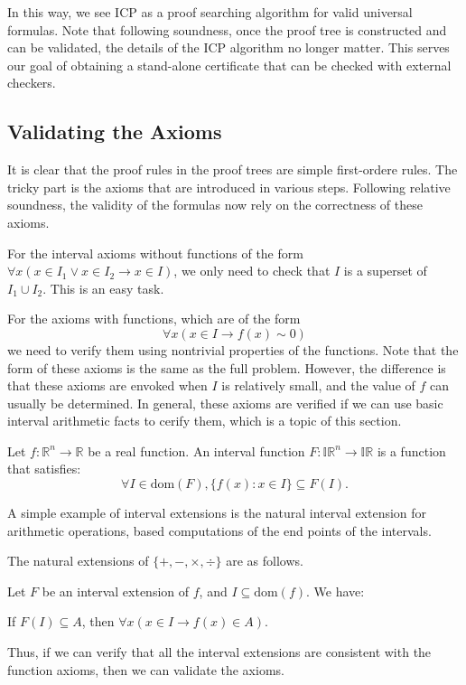\documentclass[envcountsect]{llncs}
\newcommand{\dom}{\mathrm{dom}}
\begin{document}
In this way, we see ICP as a proof searching algorithm for valid universal
formulas. Note that following soundness, once the proof tree is constructed and
can be validated, the details of the ICP algorithm no longer matter. This serves
our goal of obtaining a stand-alone certificate that can be checked with
external checkers. 

\subsection{Validating the Axioms}


It is clear that the proof rules in the proof trees are simple first-ordere
rules. The tricky part is the axioms that are introduced in various
steps. Following relative soundness, the validity of the formulas now rely on the
correctness of these axioms. 

For the interval axioms without functions of the form $\forall x(x\in I_1\vee
x\in I_2\rightarrow x\in I)$, we only need to check that $I$ is a superset of
$I_1\cup I_2$. This is an easy task. 

For the axioms with functions, which are of the form 
$$\forall x (x\in I \rightarrow f(x)\sim 0)$$
we need to verify them using nontrivial properties of the functions. Note that
the form of these axioms is the same as the full problem. However, the
difference is that these axioms are envoked when $I$ is relatively small, and
the value of $f$ can usually be determined. In general, these axioms are
verified if we can use basic interval arithmetic facts to cerify them, which is
a topic of this section. 

\begin{definition}
Let $f: \mathbb{R}^n\rightarrow \mathbb{R}$ be a real function. An interval
function $F: \mathbb{IR}^n \rightarrow \mathbb{IR}$ is a function that
satisfies: 
$$\forall I\in \dom(F), \{f(x): x\in I\}\subseteq F(I).$$
\end{definition}

A simple example of interval extensions is the natural interval extension for
arithmetic operations, based computations of the end points of the intervals. 
\begin{example}
The natural extensions of $\{+, -, \times, \div\}$ are as follows. 
\end{example}

\begin{proposition}
Let $F$ be an interval extension of $f$, and $I\subseteq \dom(f)$. We have:
\begin{center}
If $F(I)\subseteq A$, then $\forall x (x\in I \rightarrow f(x)\in A)$. 
\end{center}
\end{proposition}
Thus, if we can verify that all the interval extensions are consistent with the
function axioms, then we can validate the axioms. 
\end{document}

